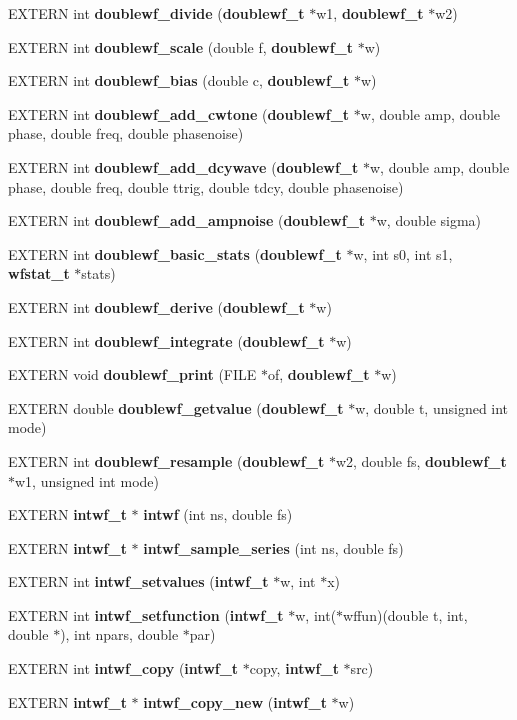 \begin{CompactItemize}
\item 
EXTERN int {\bf doublewf\_\-divide} ({\bf doublewf\_\-t} $\ast$w1, {\bf doublewf\_\-t} $\ast$w2)
\item 
EXTERN int {\bf doublewf\_\-scale} (double f, {\bf doublewf\_\-t} $\ast$w)
\item 
EXTERN int {\bf doublewf\_\-bias} (double c, {\bf doublewf\_\-t} $\ast$w)
\item 
EXTERN int {\bf doublewf\_\-add\_\-cwtone} ({\bf doublewf\_\-t} $\ast$w, double amp, double phase, double freq, double phasenoise)
\item 
EXTERN int {\bf doublewf\_\-add\_\-dcywave} ({\bf doublewf\_\-t} $\ast$w, double amp, double phase, double freq, double ttrig, double tdcy, double phasenoise)
\item 
EXTERN int {\bf doublewf\_\-add\_\-ampnoise} ({\bf doublewf\_\-t} $\ast$w, double sigma)
\item 
EXTERN int {\bf doublewf\_\-basic\_\-stats} ({\bf doublewf\_\-t} $\ast$w, int s0, int s1, {\bf wfstat\_\-t} $\ast$stats)
\item 
EXTERN int {\bf doublewf\_\-derive} ({\bf doublewf\_\-t} $\ast$w)
\item 
EXTERN int {\bf doublewf\_\-integrate} ({\bf doublewf\_\-t} $\ast$w)
\item 
EXTERN void {\bf doublewf\_\-print} (FILE $\ast$of, {\bf doublewf\_\-t} $\ast$w)
\item 
EXTERN double {\bf doublewf\_\-getvalue} ({\bf doublewf\_\-t} $\ast$w, double t, unsigned int mode)
\item 
EXTERN int {\bf doublewf\_\-resample} ({\bf doublewf\_\-t} $\ast$w2, double fs, {\bf doublewf\_\-t} $\ast$w1, unsigned int mode)
\item 
EXTERN {\bf intwf\_\-t} $\ast$ {\bf intwf} (int ns, double fs)
\item 
EXTERN {\bf intwf\_\-t} $\ast$ {\bf intwf\_\-sample\_\-series} (int ns, double fs)
\item 
EXTERN int {\bf intwf\_\-setvalues} ({\bf intwf\_\-t} $\ast$w, int $\ast$x)
\item 
EXTERN int {\bf intwf\_\-setfunction} ({\bf intwf\_\-t} $\ast$w, int($\ast$wffun)(double t, int, double $\ast$), int npars, double $\ast$par)
\item 
EXTERN int {\bf intwf\_\-copy} ({\bf intwf\_\-t} $\ast$copy, {\bf intwf\_\-t} $\ast$src)
\item 
EXTERN {\bf intwf\_\-t} $\ast$ {\bf intwf\_\-copy\_\-new} ({\bf intwf\_\-t} $\ast$w)
\item 

\end{CompactItemize}
